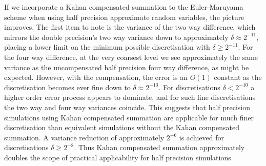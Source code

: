\documentclass[manuscript,review]{acmart}
\begin{document}
If we incorporate a Kahan compensated summation to the Euler-Maruyama scheme when using half precision approximate random variables, the picture improves. The first item to note is the variance of the two way difference, which mirrors the double precision's two way variance down to approximately $ \delta \approx  2^{-11} $, placing a lower limit on the minimum possible discretisation with $ \delta \geq 2^{-11} $. For the four way difference, at the very coarsest level we see approximately the same variance as the uncompensated half precision four way difference, as might be expected. However, with the compensation, the error is an $ O(1) $ constant as the discretisation becomes ever fine down to $ \delta \approx 2^{-10} $. For discretisations $ \delta <  2^{-10} $ a higher order error process appears to dominate, and for such fine discretisations the two way and four way variances coincide. This suggests that half precision simulations using Kahan compensated summation are applicable for much finer discretisation than equivalent simulations without the Kahan compensated summation. A variance reduction of approximately $ 2^{-6} $ is achieved for discretisations $ \delta \geq 2^{-8} $. Thus Kahan compensated summation approximately doubles the scope of practical applicability for half precision simulations. 

\begin{table}[htb]
\centering
\caption{Performance of various approximations and implementations of the inverse Gaussian cumulative distribution function, and the possible speed ups offered.}
\label{tab:implementations}

\hfil 
{}\hfil \hfil 
{}\hfil 
\end{table}
\end{document}
